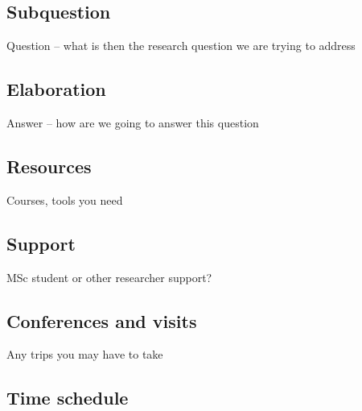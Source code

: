 \subsection{Subquestion}
Question – what is then the research question we are trying to address

\subsection{Elaboration}

Answer – how are we going to answer this question \\ \cite{TenRaa2003}

\subsection{Resources}
Courses, tools you need

\subsection{Support}
MSc student or other researcher support?

\subsection{Conferences and visits}
Any trips you may have to take

\subsection{Time schedule}
